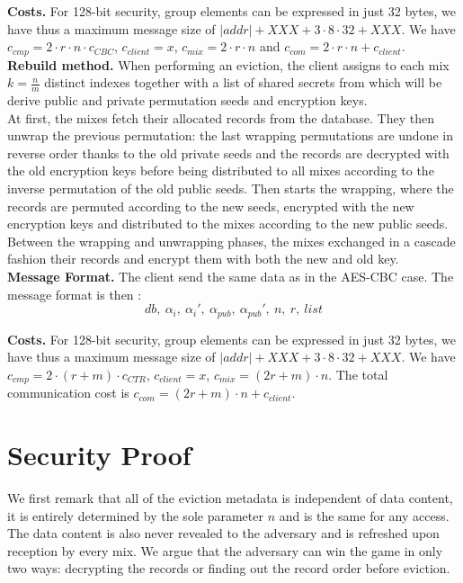 \documentclass[USenglish,oneside,twocolumn]{article}
\begin{document}
\noindent\textbf{Costs.} For 128-bit security, group elements can be expressed in just 32 bytes, we have thus a maximum message size of $|addr|+XXX + 3 \cdot 8 \cdot 32 + XXX$. We have $c_{cmp} = 2\cdot r \cdot n \cdot c_{CBC}$, $c_{client}= x$, $c_{mix}= 2\cdot r \cdot n$ and $c_{com} = 2 \cdot r \cdot n+ c_{client}$.\\

\noindent\textbf{Rebuild method.}
When performing an eviction, the client assigns to each mix  $k=\frac{n}{m}$ distinct indexes together with a list of shared secrets from which will be derive public and private permutation seeds and encryption keys.\\
At first, the mixes fetch their allocated records from the database. They then unwrap the previous permutation: the last wrapping permutations are undone in reverse order thanks to the old private seeds and the records are decrypted with the old encryption keys before being distributed to all mixes according to the inverse permutation of the old public seeds. Then starts the wrapping, where the records are permuted according to the new seeds, encrypted with the new encryption keys and distributed to the mixes according to the new public seeds. Between the wrapping and unwrapping phases, the mixes exchanged in a cascade fashion their records and encrypt them with both the new and old key.\\

\noindent\textbf{Message Format.}
The client send the same data as in the AES-CBC case. The message format is then : $$db,\  \alpha_i,\ \alpha_i',\ \alpha_{pub},\ \alpha_{pub}',\ n,\ r,\ list$$

\noindent\textbf{Costs.} For 128-bit security, group elements can be expressed in just 32 bytes, we have thus a maximum message size of $|addr|+XXX + 3 \cdot 8 \cdot 32 + XXX$. We have $c_{cmp} = 2\cdot (r+m) \cdot c_{CTR} $, $c_{client}=x$, $c_{mix}= (2r+m)\cdot n$. The total communication cost is $c_{com}= (2r+m)\cdot n + c_{client}$.

\section{Security Proof}\label{Security}

We first remark that all of the eviction metadata is independent of data content, it is entirely determined by the sole parameter $n$ and is the same for any access. The data content is also never revealed to the adversary and is refreshed upon reception by every mix.
We argue that the adversary can win the game in only two ways: decrypting the records or finding out the record order before eviction. 
\end{document}
